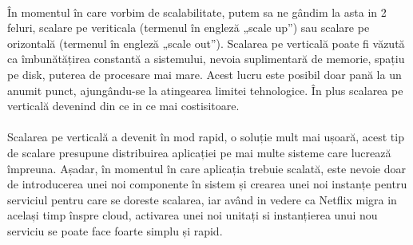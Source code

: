 \documentclass[12pt]{report}
\begin{document}
	\paragraph{}În momentul în care vorbim de scalabilitate, putem sa ne gândim la asta in 2 feluri, scalare pe veriticala (termenul în engleză „scale up”) sau scalare pe orizontală (termenul în engleză „scale out”). Scalarea pe verticală poate fi văzută ca îmbunătățirea constantă a sistemului, nevoia suplimentară de memorie, spațiu pe disk, puterea de procesare mai mare. Acest lucru este posibil doar pană la un anumit punct, ajungându-se la atingearea limitei tehnologice. În plus scalarea pe verticală devenind din ce in ce mai costisitoare.
	\paragraph{}Scalarea pe verticală a devenit în mod rapid, o soluție mult mai ușoară, acest tip de scalare presupune distribuirea aplicației pe mai multe sisteme care lucrează împreuna. Așadar, în momentul în care aplicația trebuie scalată, este nevoie doar de introducerea unei noi componente în sistem și crearea unei noi instanțe pentru serviciul pentru care se doreste scalarea, iar având in vedere ca Netflix migra in același timp înspre cloud, activarea unei noi unitați si instanțierea unui nou serviciu se poate face foarte simplu și rapid.
\end{document}
